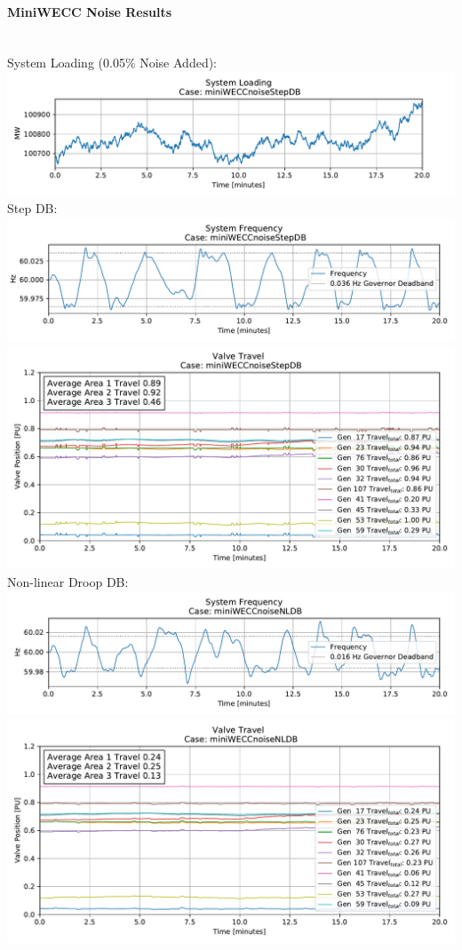 \documentclass[12pt]{article}
\begin{document}
\begin{multicols}{2}
\paragraph{MiniWECC Noise Results} \ \\
System Loading (0.05\% Noise Added):\\
\includegraphics[width=\linewidth]{miniWECCnoiseStepDBPload}
Step DB:\\
\includegraphics[width=\linewidth]{miniWECCnoiseStepDBFreq}
\includegraphics[width=\linewidth]{miniWECCnoiseStepDBValveTravel01}
Non-linear Droop DB:\\
\includegraphics[width=\linewidth]{miniWECCnoiseNLDBFreq}
\includegraphics[width=\linewidth]{miniWECCnoiseNLDBValveTravel01}

\end{multicols}
\end{document}
